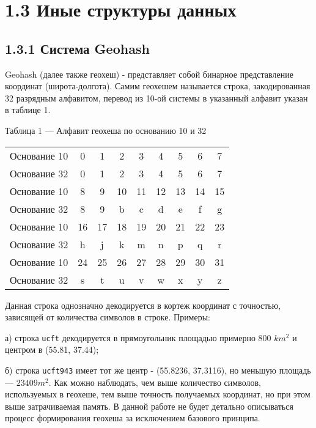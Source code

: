 \section{1.3 Иные структуры данных}

\subsection{1.3.1 Система Geohash}
Geohash (далее также геохеш) - представляет собой бинарное представление координат (широта-долгота)\cite{jiajunGeohash}. 
Самим геохешем называется строка, закодированная 32 разрядным алфавитом, перевод из 10-ой системы в указанный алфавит указан в таблице 1\cite{sahrIndexingSystems}.
\par\vspace{1em}

\noindent
Таблица 1 --- Алфавит геохеша по основанию 10 и 32
\begin{tabularx}{\textwidth}{ |X|c c c c c c c c| }
 \hline
 Основание 10 & 0 & 1 & 2 & 3 & 4 & 5 & 6 & 7 \\
 Основание 32 & 0 & 1 & 2 & 3 & 4 & 5 & 6 & 7 \\
  \hline
 Основание 10 & 8 & 9 & 10 & 11 & 12 & 13 & 14 & 15 \\
 Основание 32 & 8 & 9 & b & c & d & e & f & g \\
  \hline
 Основание 10 & 16 & 17 & 18 & 19 & 20 & 21 & 22 & 23  \\
 Основание 32 & h & j & k & m & n & p & q & r \\
  \hline
 Основание 10 & 24 & 25 & 26 & 27 & 28 & 29 & 30 & 31 \\
 Основание 32 & s & t & u & v & w & x & y & z \\
  \hline
\end{tabularx}
\par\vspace{1em}
\par\vspace{1em}

Данная строка однозначно декодируется в кортеж координат с точностью, зависящей от количества символов в строке. Примеры:
\par а) строка \texttt{ucft} декодируется в прямоугольник площадью примерно 800 $ km^2 $ и центром в (55.81, 37.44);
\par б) строка \texttt{ucft943} имеет тот же центр - (55.8236, 37.3116), но меньшую площадь --- $23409 m^2$.
Как можно наблюдать, чем выше количество символов, используемых в геохеше, тем выше точность получаемых координат, но при этом выше затрачиваемая память\cite{sidorovGeohash}.
В данной работе не будет детально описываться процесс формирования геохеша за исключением базового принципа.


